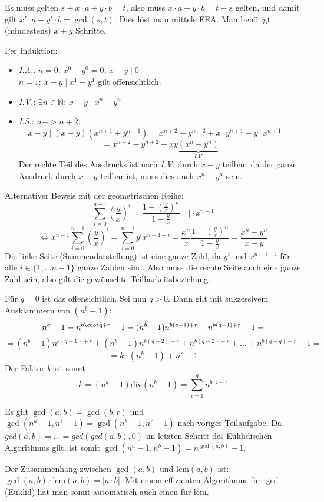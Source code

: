 \begin{flushenum}
\begin{flushalpha}
	\item Es muss gelten $s + x\cdot a + y \cdot b = t$, also muss $x\cdot a + y\cdot b = t-s$ gelten,
	und damit gilt $x'\cdot a + y' \cdot b = \gcd(s,t)$. Dies
	löst man mittels EEA. Man benötigt (mindestens) $x+y$ Schritte.
\end{flushalpha}

\item 
\begin{flushalpha}
\item Per Induktion:
\begin{itemize}
	\item \textit{I.A.}: $n=0$: $x^0 - y^0 = 0$, $x-y \mid 0$ \\ $n=1$: $x-y \mid x^1 - y^1$ gilt offensichtlich.
	\item \textit{I.V.}: $\exists n \in \mathbb{N}$: $x-y \mid x^n - y^n$
	\item \textit{I.S.}: $n -> n+2$:
	\[ x-y \mid (x-y)(x^{n+1} + y^{n+1}) = x^{n+2} - y^{n+2} + x\cdot y^{n+1} - y \cdot x^{n+1} =\]
	\[ = x^{n+2} - y^{n+2} - xy \underbrace{(x^{n} - y^{n})}_{I.V.}\]
	Der rechte Teil des Ausdrucks ist nach \textit{I.V.} durch $x-y$ teilbar, da der ganze Ausdruck durch $x-y$ teilbar ist, muss dies auch $x^n - y^n$ sein.
\end{itemize}
Alternativer Beweis mit der geometrischen Reihe:
\[ \sum_{i=0}^{n-1}\left(\frac{y}{x}\right)^i = \frac{1-\left(\frac{y}{x}\right)^n}{1-\frac{y}{x}} \quad \vert \cdot x^{n-1}\]
\[ \Leftrightarrow x^{n-1}  \sum_{i=0}^{n-1}\left(\frac{y}{x}\right)^i = \sum_{i=0}^{n-1} y^ix^{n-1-i} = \frac{x^n}{x}  \frac{1-\left(\frac{y}{x}\right)^n}{1-\frac{y}{x}}  = \frac{x^n - y^n}{x-y} \]
Die linke Seite (Summendarstellung) ist eine ganze Zahl, da $y^i$ und $x^{n-1-i}$ für alle $i \in \{1, \ldots n-1\}$ ganze Zahlen sind. Also muss
die rechte Seite auch eine ganze Zahl sein, also gilt die gewünschte Teilbarkeitsbeziehung.

\item Für $q=0$ ist das offensichtlich. Sei nun $q>0$. Dann gilt mit sukzessivem Ausklammern von $(n^b - 1)$:
\[ n^a - 1 = n^{b\cdotq + r} - 1 = (n^b - 1)n^{b(q-1) + r} + n^{b(q-1) + r} - 1 =\]\[=  (n^b - 1)n^{b(q-1) + r} + (n^b - 1)n^{b(q-2) + r} + n^{b(q-2) + r} + \ldots
+n^{b(q-q) + r} - 1 =\]\[= k \cdot (n^b-1) + n^r - 1 \]
Der Faktor $k$ ist somit \[ k = (n^a-1) \text{div} (n^b -1) = \sum_{i=1}^{q} n^{b\cdot i + r} \]
\item Es gilt $\gcd(a,b) = \gcd(b,r)$ und $\gcd(n^a-1,n^b-1) = \gcd(n^b-1,n^r-1)$ nach voriger Teilaufgabe.
Da $gcd(a,b) = \ldots = gcd( gcd(a,b), 0)$ im letzten Schritt des Euklidischen Algorithmus gilt, ist somit $\gcd(n^a -1,n^b-1) = n^{\gcd(a,b)}-1$.
\end{flushalpha}
\item Der Zusammenhang zwischen $\gcd(a,b)$ und $\text{lcm}(a,b)$ ist: $\gcd(a,b) \cdot \text{lcm}(a,b) = |a \cdot b|$. Mit einem effizienten Algorithmus für $\gcd$ (Euklid)
hat man somit automatisch auch einen für $\text{lcm}$.


\end{flushenum}
